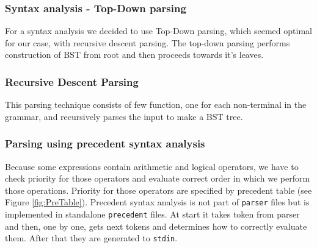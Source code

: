 \documentclass[11pt, titlepage]{article}
\begin{document}
\subsubsection{Syntax analysis - Top-Down parsing}\label{syntax-analysis---top-down-parsing}

For a syntax analysis we decided to use Top-Down parsing, which seemed
optimal for our case, with recursive descent parsing. The top-down
parsing performs construction of BST from root and then proceeds towards
it's leaves.

\subsubsection{Recursive Descent Parsing}\label{recursive-descent-parsing}

This parsing technique consists of few function, one for each
non-terminal in the grammar, and recursively parses the input to make a
BST tree.

\subsubsection{Parsing using precedent syntax
analysis}\label{parsing-using-precedent-syntax-analysis}

Because some expressions contain arithmetic and logical operators, we
have to check priority for those operators and evaluate correct order in
which we perform those operations. Priority for those operators are
specified by precedent table (see Figure \ref{fig:PreTable}). Precedent syntax
analysis is not part of \texttt{parser} files but is implemented in
standalone \texttt{precedent} files. At start it takes token from parser
and then, one by one, gets next tokens and determines how to correctly evaluate them.
After that they are generated to \texttt{stdin}.
\end{document}
